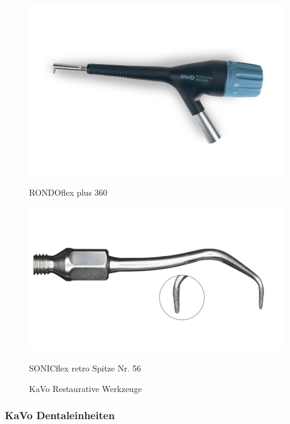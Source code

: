 \begin{figure}[H]
  \centering
  \begin{minipage}[b]{0.45\textwidth}
    \centering
    \includegraphics[width=\textwidth]{images/RONDOflex-plus-360.png}
    \caption*{RONDOflex plus 360}
  \end{minipage}
  \hspace{0.05\textwidth}
  \begin{minipage}[b]{0.45\textwidth}
    \centering
    \includegraphics[width=\textwidth]{images/SONICflex-retro-Tip-Nr-56_transparent-16-9-2000px.jpg}
    \caption*{SONICflex retro Spitze Nr. 56}
  \end{minipage}
  \caption{KaVo Restaurative Werkzeuge}
  \label{fig:Restaurative Werkzeuge}
\end{figure}
\vspace{1em}

\subsubsection{KaVo Dentaleinheiten}

